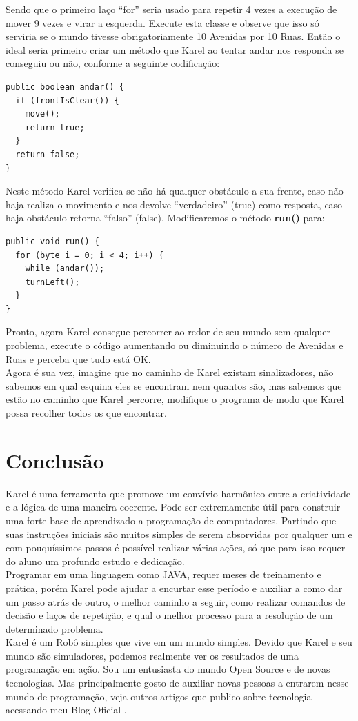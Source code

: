 \documentclass[a4paper,11pt]{article}
\begin{document}
Sendo que o primeiro laço ``for'' seria usado para repetir 4 vezes a execução de mover 9 vezes e virar a esquerda. Execute esta classe e observe que isso só serviria se o mundo tivesse obrigatoriamente 10 Avenidas por 10 Ruas. Então o ideal seria primeiro criar um método que Karel ao tentar andar nos responda se conseguiu ou não, conforme a seguinte codificação:
\begin{lstlisting}
public boolean andar() {
  if (frontIsClear()) {
    move();
    return true;
  }
  return false;
}
\end{lstlisting}
Neste método Karel verifica se não há qualquer obstáculo a sua frente, caso não haja realiza o movimento e nos devolve ``verdadeiro'' (true) como resposta, caso haja obstáculo retorna ``falso'' (false). Modificaremos o método \textbf{run()} para:
\begin{lstlisting}
public void run() {
  for (byte i = 0; i < 4; i++) {
    while (andar());
    turnLeft();
  }
}
\end{lstlisting}
Pronto, agora Karel consegue percorrer ao redor de seu mundo sem qualquer problema, execute o código aumentando ou diminuindo o número de Avenidas e Ruas e 
perceba que tudo está OK. \\[3mm]
Agora é sua vez, imagine que no caminho de Karel existam sinalizadores, não sabemos em qual esquina eles se encontram nem quantos são, mas sabemos que estão 
no caminho que Karel percorre, modifique o programa de modo que Karel possa recolher todos os que encontrar.

\section{Conclusão}
Karel é uma ferramenta que promove um convívio harmônico entre a criatividade e a lógica de uma maneira coerente. Pode ser extremamente útil para construir uma forte base de aprendizado a programação de computadores. Partindo que suas instruções iniciais são muitos simples de serem absorvidas por qualquer um e com pouquíssimos passos é possível realizar várias ações, só que para isso requer do aluno um profundo estudo e dedicação. \\[3mm]
Programar em uma linguagem como JAVA, requer meses de treinamento e prática, porém Karel pode ajudar a encurtar esse período e auxiliar a como dar um passo atrás de outro, o melhor caminho a seguir, como realizar comandos de decisão e laços de repetição, e qual o melhor processo para a resolução de um determinado problema. \\[3mm]
Karel é um Robô simples que vive em um mundo simples. Devido que Karel e seu mundo são simuladores, podemos realmente ver os resultados de uma programação em ação. Sou um entusiasta do mundo Open Source e de novas tecnologias. Mas principalmente gosto de auxiliar novas pessoas a entrarem nesse mundo de programação, veja outros artigos que publico sobre tecnologia acessando meu Blog Oficial \cite{fernandoanselmo}.
\end{document}
